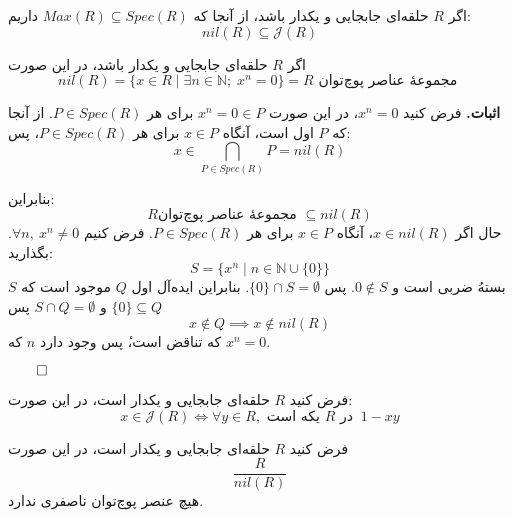 \begin{frame}
    \begin{remark}
        اگر $R$ حلقه‌ای جابجایی و یکدار باشد،
        از آنجا که $Max(R) \subseteq Spec(R)$ داریم:
        \[
            nil(R) \subseteq \mathcal{J}(R)
        \]
    \end{remark}

    \begin{theorem}
        اگر $R$ حلقه‌ای جابجایی و یکدار باشد، در این صورت
        $$nil(R) = \{ x \in R \mid \exists n \in \mathbb{N} ; \; x^n = 0 \} = R \text{ مجموعهٔ عناصر پوچ‌توان  } $$

    \end{theorem}

    \textbf{اثبات.}
    فرض کنید $x^n = 0 $، در این صورت
    $x^n = 0 \in P$
    برای هر $P \in Spec(R)$.
    از آنجا که
    \(P\)
    اول است،
    آنگاه $x \in P$ برای هر $P \in Spec(R)$، پس:
    \[
        x \in \bigcap_{P \in Spec(R)} P = nil(R)
    \]
\end{frame}

\begin{frame}
    بنابراین:
    \[
        R \text{مجموعهٔ عناصر پوچ‌توان } \subseteq nil(R)
    \]
    حال
    اگر $x \in nil(R)$، آنگاه $x \in P$ برای هر $P \in Spec(R)$.
    فرض کنیم $\forall n,\ x^n \ne 0$.
    بگذارید:
    \[
        S = \{x^n \mid n \in \mathbb{N} \cup \{0\} \}
    \]
    $S$
    بستهُ ضربی است و
    $0 \notin S$.
    پس
    \(\{0\} \cap S = \emptyset\). بنابراین ایده‌آل اول
    $Q$
    موجود است که
    \(\{0\} \subseteq Q\)
    و
    $S \cap Q = \emptyset$
    پس
    \[
        x \notin Q \implies x \notin nil(R)
    \]
    که تناقض است،ٔ پس وجود دارد \(n\) که \(x^n = 0\).

    \hfill
    \(\qed\)
\end{frame}


\begin{frame}
    \begin{exercise}
        فرض کنید
        \(R\)
        حلقه‌ای جابجایی و یکدار است، در این صورت:
        $$x \in \mathcal{J}(R) \iff \forall y \in R, \text{ یکه است } R \text{ در } \ 1 - xy  $$
    \end{exercise}

    \begin{exercise}
        فرض کنید
        \(R\)
        حلقه‌ای جابجایی و یکدار است، در این صورت
        \[
            \frac{R}{nil(R)}
        \]
        هیچ عنصر پوچ‌توان ناصفری ندارد.
    \end{exercise}
\end{frame}